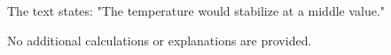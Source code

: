 The text states:  
"The temperature would stabilize at a middle value."  

No additional calculations or explanations are provided.